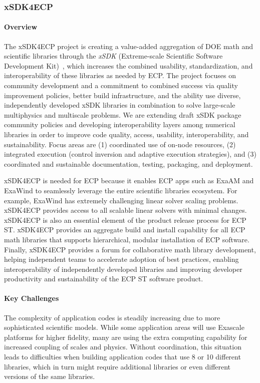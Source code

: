 \subsubsection{ xSDK4ECP} 
\paragraph{Overview} The xSDK4ECP project is creating a value-added aggregation of DOE math and scientific libraries through the {\em xSDK} (Extreme-scale Scientific Software Development Kit)~\cite{xsdk:homepage}, which increases the combined usability, standardization, and interoperability of these libraries as needed by ECP. The project focuses on community development and a commitment to combined success via quality improvement policies, better build infrastructure, and the ability use diverse, independently developed xSDK libraries in combination to solve large-scale multiphysics and multiscale problems.  We are extending draft xSDK package community policies and developing interoperability layers among numerical libraries in order to improve code quality, access, usability, interoperability, and sustainability. Focus areas are (1) coordinated use of on-node resources, (2) integrated execution (control inversion and adaptive execution strategies), and (3) coordinated and sustainable documentation, testing, packaging, and deployment.

xSDK4ECP is needed for ECP because it enables ECP apps such as ExaAM and ExaWind to seamlessly leverage the entire scientific libraries ecosystem.  For example, ExaWind has extremely challenging linear solver scaling problems.  xSDK4ECP provides access to all scalable linear solvers with minimal changes.  xSDK4ECP is also an essential element of the product release process for ECP ST.  xSDK4ECP provides an aggregate build and install capability for all ECP math libraries that supports hierarchical, modular installation of ECP software.  Finally, xSDK4ECP provides a forum for collaborative math library development, helping independent teams to accelerate adoption of best practices, enabling interoperability of independently developed libraries and improving developer productivity and sustainability of the ECP ST software product.

\paragraph{Key Challenges}
The complexity of application codes is steadily increasing due to more sophisticated scientific models.  While some application areas will use Exascale platforms for higher fidelity, many are using the extra computing capability for increased coupling of scales and physics.  Without coordination, this situation  leads to difficulties when building application codes that use 8 or 10 different libraries, which in turn might require additional libraries or even different versions of the same libraries.

